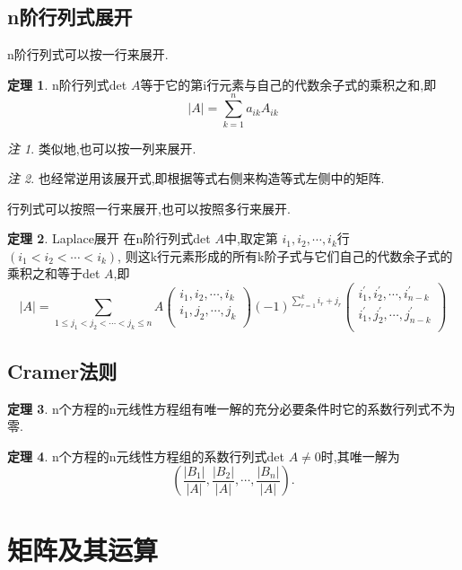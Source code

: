 \documentclass[a4paper,11pt]{article}%
\theoremstyle{remark}
\newtheorem*{remark}{注}
\theoremstyle{definition}
\newtheorem{theorem}{定理}[section]
\theoremstyle{definition}
\theoremstyle{plain}
\newcommand*{\abs}[1]{\lvert #1 \rvert}
\begin{document}
\subsection{n阶行列式展开}
n阶行列式可以按一行来展开.
\begin{theorem}
    n阶行列式det $A$等于它的第i行元素与自己的代数余子式的乘积之和,即
    $$\lvert A \rvert =\sum_{k=1}^{n}a_{ik}A_{ik}$$
\end{theorem}
\begin{remark}
    类似地,也可以按一列来展开.
\end{remark}
\begin{remark}
    也经常逆用该展开式,即根据等式右侧来构造等式左侧中的矩阵.
\end{remark}
行列式可以按照一行来展开,也可以按照多行来展开.
\begin{theorem}{Laplace展开}
   在n阶行列式det $A$中,取定第 $i_1,i_2,\cdots,i_k$行 $(i_1<i_2<\cdots<i_k)$,
   则这k行元素形成的所有k阶子式与它们自己的代数余子式的乘积之和等于det $A$,即
   \begin{equation*}
   \abs{A}=\sum_{1\leq j_1<j_2<\cdots<j_k\leq n}A
       \begin{pmatrix}
        i_1,i_2,\cdots,i_{k}\\
        i_1,j_2,\cdots,j_{k}\\
       \end{pmatrix}(-1)^{\sum_{r=1}^{k}{i_r+j_r}}
       \begin{pmatrix}
        i_1^{\prime},i_2^{\prime},\cdots,i_{n-k}^{\prime}\\
        i_1^{\prime},j_2^{\prime},\cdots,j_{n-k}^{\prime}\\
       \end{pmatrix}
    \end{equation*}
\end{theorem}
\subsection{Cramer法则}
\begin{theorem}
    n个方程的n元线性方程组有唯一解的充分必要条件时它的系数行列式不为零.
\end{theorem}
\begin{theorem}
    n个方程的n元线性方程组的系数行列式det $A\neq0$时,其唯一解为
    $$\left(\frac{\lvert B_1\rvert}{\abs{A}},\frac{\abs{B_2}}{\abs{A}},\cdots,\frac{\abs{B_n}}{\abs{A}}\right).$$
\end{theorem}
\section{矩阵及其运算}
\end{document}
